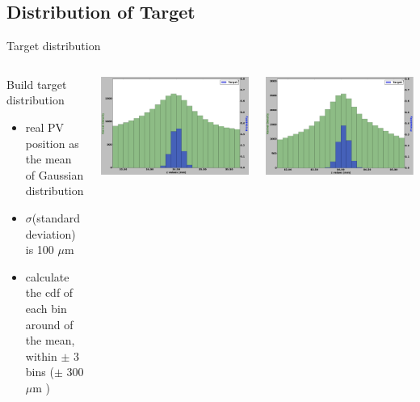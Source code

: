 \subsection{Distribution of Target}
\begin{frame}{Target distribution}
\begin{columns}[c]
    \begin{block}{Build target distribution}
      \begin{itemize}
          \item real PV position as the mean of Gaussian distribution 
          \item $\sigma $(standard deviation) is 100 $\mu$m
          \item calculate the cdf of each bin around of the mean, within $\pm$ 3 bins ($\pm$ 300 $\mu$m )
      \end{itemize}
    \end{block}
    \begin{center}
            \includegraphics[width=1\textwidth,height=0.45\textwidth,trim=18 0 18 0]{images/T_1_12.png}
            
        \end{center}
      \begin{center}
    \includegraphics[width=1\textwidth,height=0.45\textwidth, trim=18 0 18 0]{images/T_2_12.png}
    

\end{center}
\end{columns}
\end{frame}
